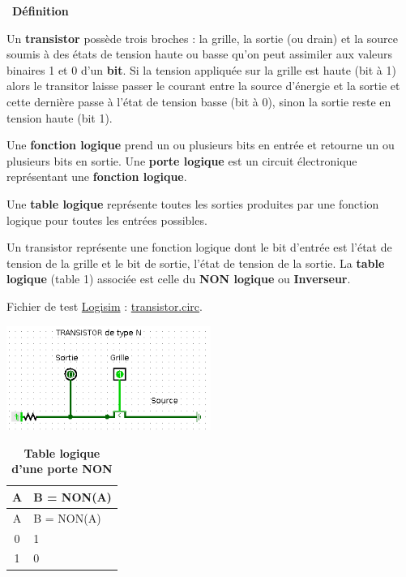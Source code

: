 \documentclass[
  11pt,
]{article}
\newcounter{def}
\newenvironment{definition}[1]
{\par \medskip   \addtocounter{def}{1} \noindent  
\begin{bclogo}[arrondi =0.1,  ombre = true, barre=none, logo=\bcbook, marge=4]{~\textbf{Définition} \textbf{\thedef} {\itshape #1} }  \par}
{
\end{bclogo}
 \par \bigskip }
\newcounter{logi}
\begin{document}
\begin{definition}{}

Un \textbf{transistor} possède trois broches : la grille, la sortie (ou
drain) et la source soumis à des états de tension haute ou basse qu'on
peut assimiler aux valeurs binaires 1 et 0 d'un \textbf{bit}. Si la
tension appliquée sur la grille est haute (bit à 1) alors le transitor
laisse passer le courant entre la source d'énergie et la sortie et cette
dernière passe à l'état de tension basse (bit à 0), sinon la sortie
reste en tension haute (bit 1).

Une \textbf{fonction logique} prend un ou plusieurs bits en entrée et
retourne un ou plusieurs bits en sortie. Une \textbf{porte logique} est
un circuit électronique représentant une \textbf{fonction logique}.

Une \textbf{table logique} représente toutes les sorties produites par
une fonction logique pour toutes les entrées possibles.

Un transistor représente une fonction logique dont le bit d'entrée est
l'état de tension de la grille et le bit de sortie, l'état de tension de
la sortie. La \textbf{table logique} (table 1) associée est celle du
\textbf{NON logique} ou \textbf{Inverseur}.

Fichier de test \href{http://www.cburch.com/logisim/}{Logisim} :
\href{circuits_logisim/transistor.circ}{transistor.circ}.

\end{definition}

\begin{center}{}

\includegraphics[width=0.5\textwidth,height=\textheight]{images/transistor.png}\\

\end{center}

\begin{longtable}[]{@{}cl@{}}
\caption{\textbf{Table logique d'une porte NON}}\tabularnewline
\toprule
A & B = NON(A)\tabularnewline
\midrule
\endfirsthead
\toprule
A & B = NON(A)\tabularnewline
\midrule
\endhead
0 & 1\tabularnewline
1 & 0\tabularnewline
\bottomrule
\end{longtable}
\end{document}
